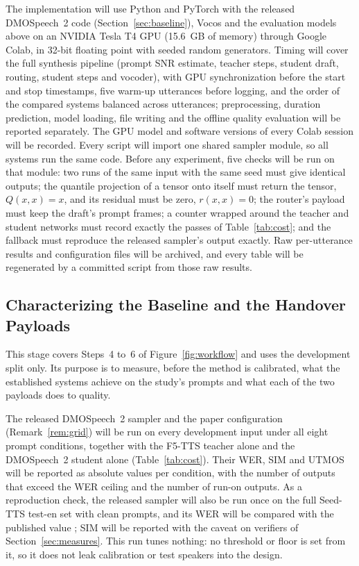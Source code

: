 The implementation will use Python and PyTorch with the released DMOSpeech~2 code (Section~\ref{sec:baseline}), Vocos \parencite{siuzdak2024vocos} and the evaluation models above on an NVIDIA Tesla T4 GPU (15.6~GB of memory) through Google Colab, in 32-bit floating point with seeded random generators. Timing will cover the full synthesis pipeline (prompt SNR estimate, teacher steps, student draft, routing, student steps and vocoder), with GPU synchronization before the start and stop timestamps, five warm-up utterances before logging, and the order of the compared systems balanced across utterances; preprocessing, duration prediction, model loading, file writing and the offline quality evaluation will be reported separately. The GPU model and software versions of every Colab session will be recorded. Every script will import one shared sampler module, so all systems run the same code. Before any experiment, five checks will be run on that module: two runs of the same input with the same seed must give identical outputs; the quantile projection of a tensor onto itself must return the tensor, $Q(x,x)=x$, and its residual must be zero, $r(x,x)=0$; the router's payload must keep the draft's prompt frames; a counter wrapped around the teacher and student networks must record exactly the passes of Table~\ref{tab:cost}; and the fallback must reproduce the released sampler's output exactly. Raw per-utterance results and configuration files will be archived, and every table will be regenerated by a committed script from those raw results.

\subsection{Characterizing the Baseline and the Handover Payloads}
\label{sec:obj1}

This stage covers Steps~4 to~6 of Figure~\ref{fig:workflow} and uses the development split only. Its purpose is to measure, before the method is calibrated, what the established systems achieve on the study's prompts and what each of the two payloads does to quality.

 The released DMOSpeech~2 sampler and the paper configuration (Remark~\ref{rem:grid}) will be run on every development input under all eight prompt conditions, together with the F5-TTS teacher alone and the DMOSpeech~2 student alone (Table~\ref{tab:cost}). Their WER, SIM and UTMOS will be reported as absolute values per condition, with the number of outputs that exceed the WER ceiling and the number of run-on outputs. As a reproduction check, the released sampler will also be run once on the full Seed-TTS test-en set with clean prompts, and its WER will be compared with the published value \parencite{li2025dmospeech2}; SIM will be reported with the caveat on verifiers of Section~\ref{sec:measures}. This run tunes nothing: no threshold or floor is set from it, so it does not leak calibration or test speakers into the design.

